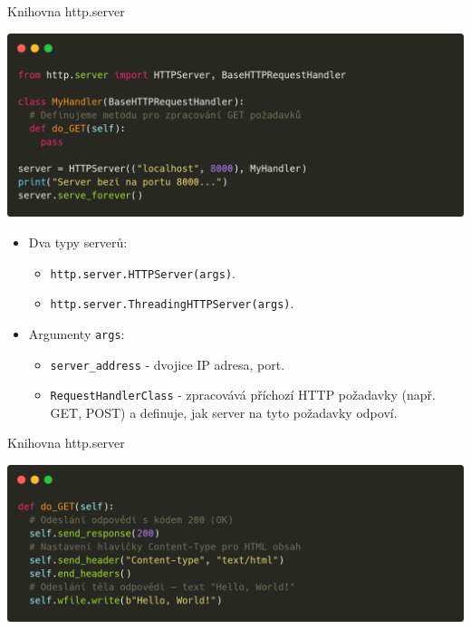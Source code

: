 \documentclass{beamer}
\begin{document}
\begin{frame}{Knihovna http.server}
    \begin{center}
        \includegraphics[width=\textwidth]{obrazky/codes/carbon13.png}
    \end{center}

	\begin{itemize}
		\item Dva typy serverů:
		\begin{itemize}
			\item \texttt{http.server.HTTPServer(args)}.
			\item \texttt{http.server.ThreadingHTTPServer(args)}.
		\end{itemize}
		\item Argumenty \texttt{args}:
		\begin{itemize}
			\item \texttt{server\_address} - dvojice IP adresa, port.
			\item \texttt{RequestHandlerClass} - zpracovává příchozí HTTP požadavky (např. GET, POST) a definuje, jak server na tyto požadavky odpoví.
		\end{itemize}
	\end{itemize}	
\end{frame}

\begin{frame}{Knihovna http.server}
    \begin{center}
        \includegraphics[width=\textwidth]{obrazky/codes/carbon14.png}
    \end{center}
\end{frame}
\end{document}
